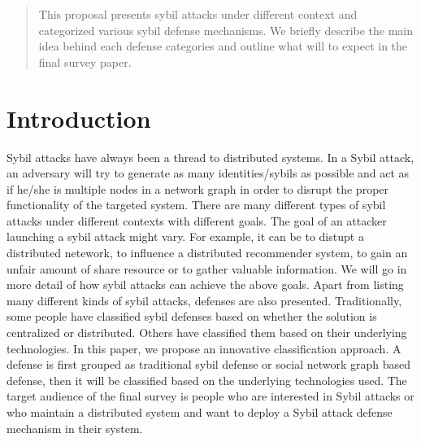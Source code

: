 \documentclass[conference]{IEEEtran}
\begin{document}
\begin{abstract}
This  proposal presents sybil attacks under different context and categorized various sybil defense mechanisms. We briefly describe the main idea behind each defense categories and outline what will to expect in the final survey paper. 
\end{abstract}





%
\IEEEpeerreviewmaketitle



\section{Introduction}

Sybil attacks have always been a thread to distributed systems.
In a Sybil attack, an adversary will try to generate as many identities/sybils as possible and act as if he/she is multiple nodes in a network graph in order to disrupt the proper functionality of the targeted system. 
There are many different types of sybil attacks under different contexts with different goals. 
The goal of an attacker launching a sybil attack might vary. For example, it can be to distupt a distributed netework, to influence a distributed recommender system, to gain an unfair amount of share resource or to gather valuable information.
We will go in more detail of how sybil attacks can achieve the above goals. Apart from listing many different kinds of sybil attacks, defenses are also presented.
Traditionally, some people have classified sybil defenses based on whether the solution is centralized or distributed.
Others have classified them based on their underlying technologies. In this paper, we propose an innovative classification approach. A defense is first grouped as traditional sybil defense or social network graph based defense, then it will be classified based on the underlying technologies used. The target audience of the final survey is people who are interested in Sybil attacks or who maintain a distributed system and want to deploy a Sybil attack defense mechanism in their system.
\end{document}
